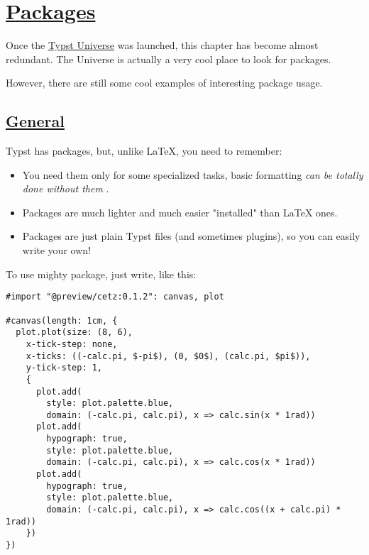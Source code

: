 \section{\texorpdfstring{\hyperref[packages]{Packages}}{Packages}}\label{packages}

Once the \href{https://typst.app/universe}{Typst Universe} was launched,
this chapter has become almost redundant. The Universe is actually a
very cool place to look for packages.

However, there are still some cool examples of interesting package
usage.

\subsection{\texorpdfstring{\hyperref[general]{General}}{General}}\label{general}

Typst has packages, but, unlike LaTeX, you need to remember:

\begin{itemize}
\tightlist
\item
  You need them only for some specialized tasks, basic formatting
  \emph{can be totally done without them} .
\item
  Packages are much lighter and much easier "installed" than LaTeX ones.
\item
  Packages are just plain Typst files (and sometimes plugins), so you
  can easily write your own!
\end{itemize}

To use mighty package, just write, like this:

\begin{verbatim}
#import "@preview/cetz:0.1.2": canvas, plot

#canvas(length: 1cm, {
  plot.plot(size: (8, 6),
    x-tick-step: none,
    x-ticks: ((-calc.pi, $-pi$), (0, $0$), (calc.pi, $pi$)),
    y-tick-step: 1,
    {
      plot.add(
        style: plot.palette.blue,
        domain: (-calc.pi, calc.pi), x => calc.sin(x * 1rad))
      plot.add(
        hypograph: true,
        style: plot.palette.blue,
        domain: (-calc.pi, calc.pi), x => calc.cos(x * 1rad))
      plot.add(
        hypograph: true,
        style: plot.palette.blue,
        domain: (-calc.pi, calc.pi), x => calc.cos((x + calc.pi) * 1rad))
    })
})
\end{verbatim}

\pandocbounded{}


